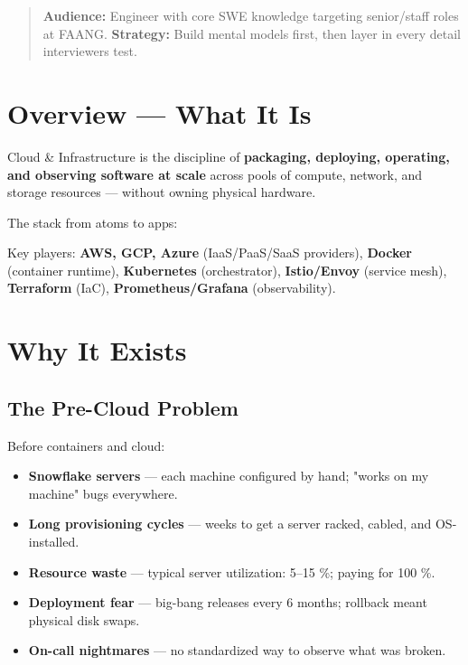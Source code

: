 \documentclass[11pt]{article}
\providecommand{\tightlist}{\setlength{\itemsep}{1pt}\setlength{\parskip}{0pt}}
\begin{document}
\makecoverpage

\thispagestyle{empty}
{\hypersetup{hidelinks}\tableofcontents}
\clearpage

\begin{quote}
\textbf{Audience:} Engineer with core SWE knowledge targeting senior/staff roles at FAANG.
\textbf{Strategy:} Build mental models first, then layer in every detail interviewers test.
\end{quote}

\section{Overview --- What It Is}\label{overview--what-it-is}

Cloud \& Infrastructure is the discipline of \textbf{packaging, deploying, operating, and observing software at scale} across pools of compute, network, and storage resources --- without owning physical hardware.

The stack from atoms to apps:


Key players: \textbf{AWS, GCP, Azure} (IaaS/PaaS/SaaS providers), \textbf{Docker} (container runtime), \textbf{Kubernetes} (orchestrator), \textbf{Istio/Envoy} (service mesh), \textbf{Terraform} (IaC), \textbf{Prometheus/Grafana} (observability).


\section{Why It Exists}\label{why-it-exists}

\subsection{The Pre-Cloud Problem}\label{the-pre-cloud-problem}

Before containers and cloud:

\begin{itemize}
\tightlist
\item
  \textbf{Snowflake servers} --- each machine configured by hand; "works on my machine" bugs everywhere.
\item
  \textbf{Long provisioning cycles} --- weeks to get a server racked, cabled, and OS-installed.
\item
  \textbf{Resource waste} --- typical server utilization: 5--15 \%; paying for 100 \%.
\item
  \textbf{Deployment fear} --- big-bang releases every 6 months; rollback meant physical disk swaps.
\item
  \textbf{On-call nightmares} --- no standardized way to observe what was broken.
\end{itemize}
\end{document}
